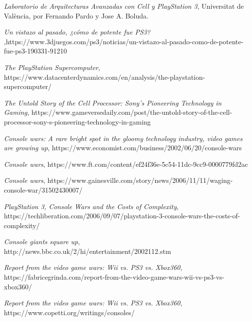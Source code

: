 \documentclass[11pt,compsoc]{IEEEtran}
\begin{document}
	
		\begin{thebibliography}{1}
			
			{\it{Laboratorio de Arquitecturas Avanzadas con Cell y PlayStation 3}}, Universitat de València, por Fernando Pardo y Jose A. Boluda.
			
			{\it{Un vistazo al pasado, ¿cómo de potente fue PS3? }},https://www.3djuegos.com/ps3/noticias/un-vistazo-al-pasado-como-de-potente-fue-ps3-190331-91210
		
			{\it{The PlayStation Supercomputer}}, https://www.datacenterdynamics.com/en/analysis/the-playstation-supercomputer/
			
			{\it{The Untold Story of the Cell Processor: Sony's Pioneering Technology in Gaming}}, https://www.gameversedaily.com/post/the-untold-story-of-the-cell-processor-sony-s-pioneering-technology-in-gaming
			
			{\it{Console wars: A rare bright spot in the gloomy technology industry, video games are growing up}}, 
			https://www.economist.com/business/2002/06/20/console-wars
			
			{\it{Console wars}}, 			https://www.ft.com/content/ef24f36e-5c54-11dc-9cc9-0000779fd2ac
			
			{\it{Console wars}}, 			
			https://www.gainesville.com/story/news/2006/11/11/waging-console-war/31502430007/
			
			{\it{PlayStation 3, Console Wars and the Costs of Complexity}}, 			
			https://techliberation.com/2006/09/07/playstation-3-console-wars-the-costs-of-complexity/
			
			{\it{Console giants square up}}, 			
			http://news.bbc.co.uk/2/hi/entertainment/2002112.stm
			
			{\it{Report from the video game wars: Wii vs. PS3 vs. Xbox360}}, 
			https://fabricegrinda.com/report-from-the-video-game-wars-wii-vs-ps3-vs-xbox360/
			
			{\it{Report from the video game wars: Wii vs. PS3 vs. Xbox360}}, 
			https://www.copetti.org/writings/consoles/
		
		\end{thebibliography}
		
			
	
		
\end{document}
